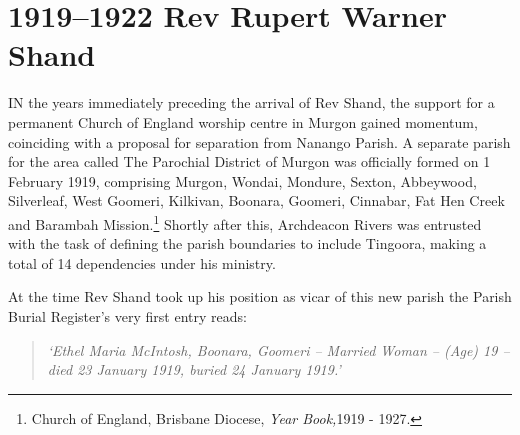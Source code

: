 \balance


\printendnotes[custom]
\setcounter{endnote}{0}
\chapter{1919--1922 Rev Rupert Warner Shand}
\nobalance


\lettrine[lines=3]{I}{N}
 the years immediately preceding the arrival of Rev Shand, the support for a permanent Church of England worship centre in Murgon gained momentum, coinciding with a proposal for separation from Nanango Parish. A separate parish for the area called The Parochial District of Murgon was officially formed on 1 February 1919, comprising Murgon, Wondai, Mondure, Sexton, Abbeywood, Silverleaf, West Goomeri, Kilkivan, Boonara, Goomeri, Cinnabar, Fat Hen Creek and Barambah Mission.\footnote{Church of England, Brisbane Diocese, \emph{Year Book,}1919 - 1927.} Shortly after this, Archdeacon Rivers was entrusted with the task of defining the parish boundaries to include Tingoora, making a total of 14 dependencies under his ministry.

At the time Rev Shand took up his position as vicar of this new parish the Parish Burial Register's very first entry reads:



\begin{quote}

\emph{`Ethel Maria McIntosh, Boonara, Goomeri -- Married Woman -- (Age) 19 -- died 23 January 1919, buried 24 January 1919.'}

\end{quote}









